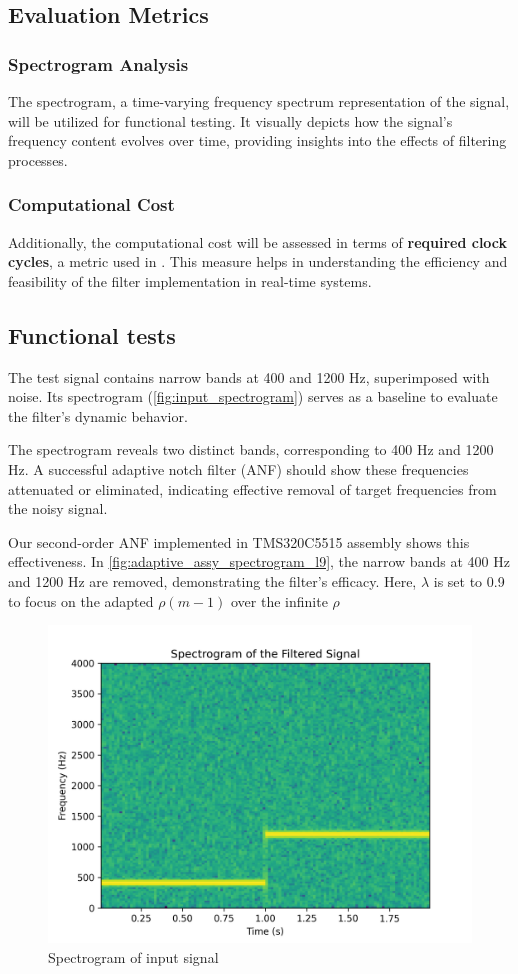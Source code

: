 \subsection{Evaluation Metrics}

\subsubsection{Spectrogram Analysis}
The spectrogram, a time-varying frequency spectrum representation of the signal, will be utilized for functional testing. It visually depicts how the signal's frequency content evolves over time, providing insights into the effects of filtering processes.

\subsubsection{Computational Cost}
Additionally, the computational cost will be assessed in terms of \textbf{required clock cycles}, a metric used in \cite{van2012time}. This measure helps in understanding the efficiency and feasibility of the filter implementation in real-time systems.

\subsection{Functional tests}
The test signal contains narrow bands at 400 and 1200 Hz, superimposed with noise. Its spectrogram (\autoref{fig:input_spectrogram}) serves as a baseline to evaluate the filter's dynamic behavior.

The spectrogram reveals two distinct bands, corresponding to 400 Hz and 1200 Hz. A successful adaptive notch filter (ANF) should show these frequencies attenuated or eliminated, indicating effective removal of target frequencies from the noisy signal.

Our second-order ANF implemented in TMS320C5515 assembly shows this effectiveness. In \autoref{fig:adaptive_assy_spectrogram_l9}, the narrow bands at 400 Hz and 1200 Hz are removed, demonstrating the filter's efficacy.  Here, $\lambda$ is set to 0.9 to focus on the  adapted $\rho(m-1)$ over the infinite $\rho$

\begin{figure}[ht]
    \centering
    \includegraphics[width=0.5\columnwidth]{images/spectrogram_input.png}
    \caption{Spectrogram of input signal}
    \label{fig:input_spectrogram}
\end{figure}

